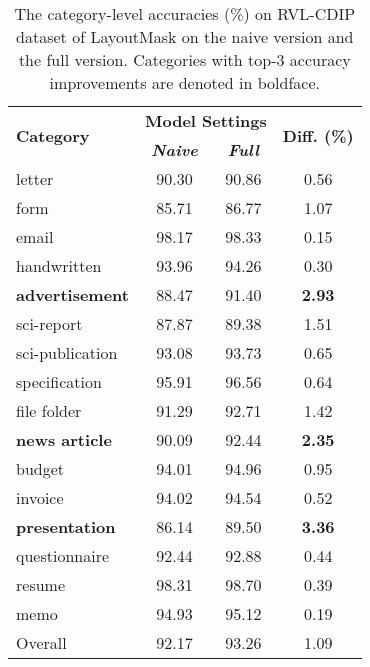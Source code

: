 \documentclass[11pt]{article}
\begin{document}
 \begin{table}[!tb]
\centering
\begin{tabular}{l|cc|c}
\hline
\multirow{2}{*}{\textbf{Category}} & \multicolumn{2}{c|}{\textbf{Model Settings}} & \multirow{2}{*}{\textbf{Diff. (\%)}} \\ \cline{2-3}
        & \textbf{\textit{Naive}} & \textbf{\textit{Full}} & \\ \hline
letter         & 90.30      & 90.86   & 0.56 \\
form          & 85.71      & 86.77   & 1.07 \\
email         & 98.17      & 98.33   & 0.15 \\
handwritten      & 93.96      & 94.26   & 0.30 \\
\textbf{advertisement}     & 88.47      & 91.40   & \textbf{2.93} \\
sci-report   & 87.87      & 89.38   & 1.51 \\
sci-publication & 93.08      & 93.73   & 0.65 \\
specification     & 95.91      & 96.56   & 0.64 \\
file folder      & 91.29      & 92.71   & 1.42 \\
\textbf{news article}      & 90.09      & 92.44   & \textbf{2.35} \\
budget         & 94.01      & 94.96   & 0.95 \\
invoice        & 94.02      & 94.54   & 0.52 \\
\textbf{presentation}      & 86.14      &89.50   & \textbf{3.36} \\
questionnaire     & 92.44      & 92.88   & 0.44 \\
resume         & 98.31      & 98.70   & 0.39 \\
memo          & 94.93      & 95.12   & 0.19 \\ \hline
Overall        & 92.17      & 93.26   & 1.09 \\ \hline
\end{tabular}
\caption{\label{table:rvlcdip-compare}
The category-level accuracies (\%) on RVL-CDIP dataset of LayoutMask on the naive version and the full version. Categories with top-3 accuracy improvements are denoted in boldface.
}
\end{table}
\end{document}
